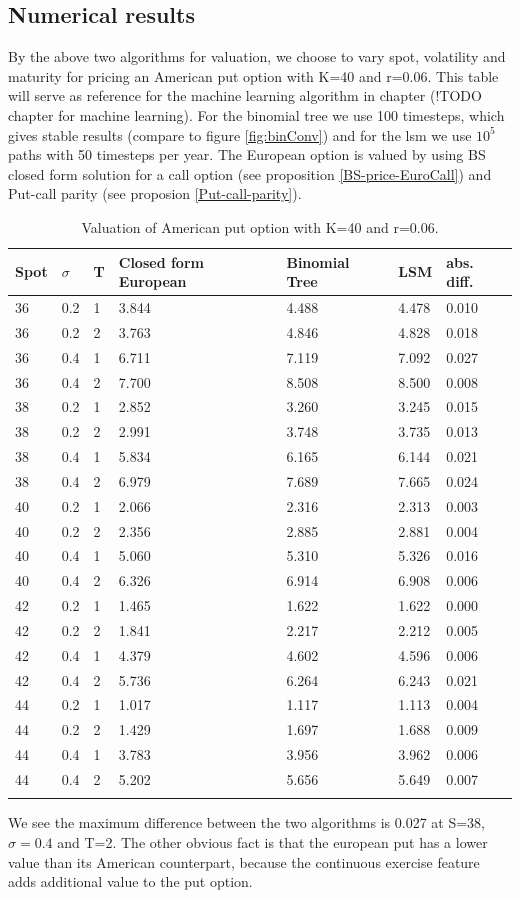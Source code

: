 \subsection{Numerical results}
By the above two algorithms for valuation, we choose to vary spot, volatility and maturity for pricing an American put option with K=40 and r=0.06. This table will serve as reference for the machine learning algorithm in chapter (!TODO chapter for machine learning). For the binomial tree we use 100 timesteps, which gives stable results (compare to figure \ref{fig:binConv}) and for the lsm we use $10^5$ paths with 50 timesteps per year. The European option is valued by using BS closed form solution for a call option (see proposition \ref{BS-price-EuroCall}) and Put-call parity (see proposion \ref{Put-call-parity}).
\begin{table}[th]
\caption{Valuation of American put option with K=40 and r=0.06.}
\label{tab:treatments}
\centering
\begin{tabular}{l l l l l l l }
\toprule
\textbf{Spot} & \textbf{$\sigma$} & \textbf{T} & \textbf{Closed form European} & \textbf{Binomial Tree} & \textbf{LSM} & \textbf{abs. diff.} \\
\midrule
36 & 0.2 & 1 & 3.844 & 4.488 & 4.478 & 0.010\\
36 & 0.2 & 2 & 3.763 & 4.846 & 4.828 & 0.018\\
36 & 0.4 & 1 & 6.711 & 7.119 & 7.092 & 0.027\\
36 & 0.4 & 2 & 7.700 & 8.508 & 8.500 & 0.008\\
38 & 0.2 & 1 & 2.852 & 3.260 & 3.245 & 0.015\\
38 & 0.2 & 2 & 2.991 & 3.748 & 3.735 & 0.013\\
38 & 0.4 & 1 & 5.834 & 6.165 & 6.144 & 0.021\\
38 & 0.4 & 2 & 6.979 & 7.689 & 7.665 & 0.024\\
40 & 0.2 & 1 & 2.066 & 2.316 & 2.313 & 0.003\\
40 & 0.2 & 2 & 2.356 & 2.885 & 2.881 & 0.004\\
40 & 0.4 & 1 & 5.060 & 5.310 & 5.326 & 0.016\\
40 & 0.4 & 2 & 6.326 & 6.914 & 6.908 & 0.006\\
42 & 0.2 & 1 & 1.465 & 1.622 & 1.622 & 0.000\\
42 & 0.2 & 2 & 1.841 & 2.217 & 2.212 & 0.005\\
42 & 0.4 & 1 & 4.379 & 4.602 & 4.596 & 0.006\\
42 & 0.4 & 2 & 5.736 & 6.264 & 6.243 & 0.021\\
44 & 0.2 & 1 & 1.017 & 1.117 & 1.113 & 0.004\\
44 & 0.2 & 2 & 1.429 & 1.697 & 1.688 & 0.009\\
44 & 0.4 & 1 & 3.783 & 3.956 & 3.962 & 0.006\\
44 & 0.4 & 2 & 5.202 & 5.656 & 5.649 & 0.007\\
\bottomrule\\
\end{tabular}
\end{table}
We see the maximum difference between the two algorithms is 0.027 at S=38, $\sigma=0.4$ and T=2. The other obvious fact is that the european put has a lower value than its American counterpart, because the continuous exercise feature adds additional value to the put option. 
